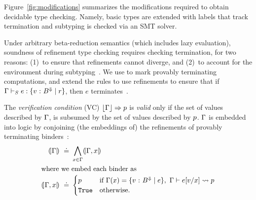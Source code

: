 Figure~\ref{fig:modifications} summarizes the modifications required
to obtain decidable type checking.
%
Namely, basic types are extended with labels that track termination
and subtyping is checked via an SMT solver.

%
Under arbitrary beta-reduction semantics
(which includes lazy evaluation), soundness
of refinement type checking requires checking
termination, for two reasons:
%
(1)~to ensure that refinements cannot diverge, and
(2)~to account for the environment during subtyping~\citep{Vazou14}.
%
We use \tlabel to mark provably terminating
computations, and extend the rules to use
refinements to ensure that if
${\Gamma \vdash_{S} e : \{ {v} \ \text{:}\ {B^\Downarrow} \mid r \}}$,
then $e$ terminates~\citep{Vazou14}.
%


The \emph{verification condition} (VC)
${\lfloor \Gamma\rfloor  \Rightarrow p}$
is \emph{valid} only if the set of values
described by $\Gamma$, is subsumed by
the set of values described by $p$.
%
$\Gamma$ is embedded into logic by conjoining
(the embeddings of) the refinements of
provably terminating binders~\cite{Vazou14}:
%
\begin{align*}
(\!|\Gamma|\!) \ \doteq\  & \bigwedge_{x \in \Gamma} (\!|\Gamma, x|\!) \\
\intertext{where we embed each binder as}
(\!|\Gamma, x|\!) \ \doteq\  & \begin{cases}
                           p  & \text{if } \Gamma(x)=\{ {v} \ \text{:}\ {B^{\Downarrow}} \mid e \},\
                                     \Gamma\vdash e[{v}/{x}] \rightsquigarrow p  \\
                           \texttt{True} & \text{otherwise}.
                         \end{cases}
\end{align*}


